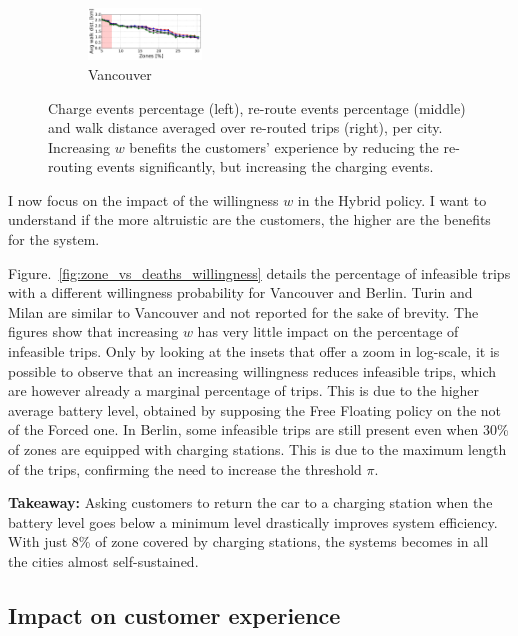 \begin{figure}[t!]
\begin{center}
\begin{subfigure}{\textwidth}
            \includegraphics[width=0.33\textwidth]{figures/cut_Vancouver_AvgWalkedDistanceVsZones_Policy_44_tt-25_100_4.pdf}
             \caption{Vancouver}
             \label{fig:zone_vs_metric_vancouver}
         \end{subfigure}         
         \caption{Charge events percentage (left), re-route events percentage (middle) and walk distance averaged over re-routed trips (right),  per city. Increasing $w$ benefits the customers' experience by reducing the re-routing events significantly, but increasing the charging events.}
         \label{fig:zone_vs_metric}
\end{center}
\end{figure}

I now focus on the impact of the willingness $w$ in the Hybrid policy. I want to understand if the more altruistic are the customers, the higher are the benefits for the system.

Figure.~\ref{fig:zone_vs_deaths_willingness} details the percentage of infeasible trips with a different willingness probability for Vancouver and Berlin. Turin and Milan are similar to Vancouver and not reported for the sake of brevity. The figures show that increasing $w$ has very little impact on the percentage of infeasible trips. Only by looking at the insets that offer a zoom in log-scale, it is possible to observe that an increasing willingness reduces infeasible trips, which are however already a marginal percentage of trips. This is due to the higher average battery level, obtained by supposing the Free Floating policy on the not of the Forced one.
In Berlin, some infeasible trips are still present even when 30\% of zones are equipped with charging stations. This is due to the maximum length of the trips, confirming the need to increase the threshold $\pi$. 

\textbf{Takeaway:} Asking customers to return the car to a charging station when the battery level goes below a minimum level drastically improves system efficiency. With just 8\% of zone covered by charging stations, the systems becomes in all the cities almost self-sustained.

\subsection{Impact on customer experience}


